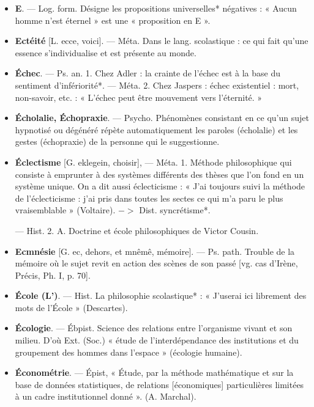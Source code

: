 
	\begin{itemize}[leftmargin=1cm, label=, itemsep=1pt]

\item {\bf E}. — Log. form. Désigne les propositions universelles* négatives : « Aucun homme n’est éternel » est une
« proposition en E ».

\item {\bf Ectéité} [L. ecce, voici]. — Méta. Dans
le lang. scolastique : ce qui fait qu’une
essence s’individualise et est présente au monde.

\item {\bf Échec}. — Ps. an. 1. Chez Adler : la
crainte de l’échec est à la base du
sentiment d’infériorité*. — Méta.
2. Chez Jaspers : échec existentiel :
mort, non-savoir, etc. : « L’échec
peut être mouvement vers l’éternité. »

\item {\bf Écholalie, Échopraxie}. — Psycho.
Phénomènes consistant en ce qu'un
sujet hypnotisé ou dégénéré répète
automatiquement les paroles (écholalie) et les gestes (échopraxie) de la
personne qui le suggestionne.

\item {\bf Éclectisme} [G. eklegein, choisir], —
Méta. 1. Méthode philosophique qui
consiste à emprunter à des systèmes
différents des thèses que l’on fond
en un système unique. On a dit aussi
éclecticisme : « J’ai toujours suivi la
méthode de l’éclecticisme : j'ai pris
dans toutes les sectes ce qui m'a
paru le plus vraisemblable » (Voltaire). $->$ Dist. syncrétisme*.

— Hist. 2. A. Doctrine et école
philosophiques de Victor Cousin.

\item {\bf Ecmnésie} [G. ec, dehors, et mnêmê,
mémoire]. — Ps. path. Trouble de
la mémoire où le sujet revit en action
des scènes de son passé [vg. cas
d’Irène, Précis, Ph. I, p. 70].

\item {\bf École (L’)}. — Hist. La philosophie scolastique* : « J'userai ici librement
des mots de l’École » (Descartes).

\item {\bf Écologie}. — Ébpist. Science des relations entre l'organisme vivant et
son milieu. D'où Ext. (Soc.) « étude
de l’interdépendance des institutions
et du groupement des hommes dans
l’espace » (écologie humaine).

\item {\bf Économétrie}. — Épist, « Étude, par la
méthode mathématique et sur la
base de données statistiques, de
relations [économiques]  particulières limitées à un cadre institutionnel donné ». (A. Marchal).


\end{itemize}
